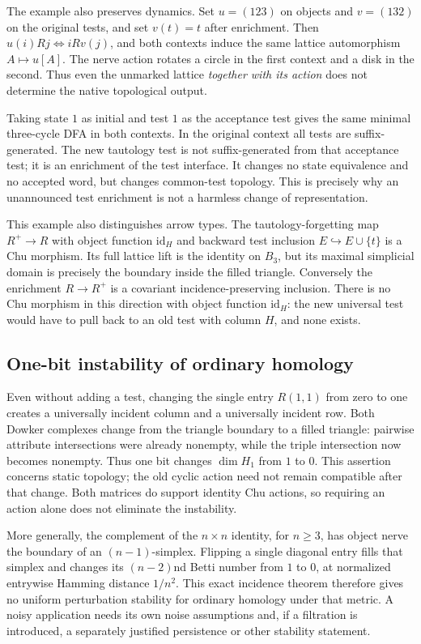 \documentclass[11pt]{article}
\theoremstyle{remark}
\begin{document}
The example also preserves dynamics. Set $u=(123)$ on objects and
$v=(132)$ on the original tests, and set $v(t)=t$ after enrichment.
Then $u(i)Rj\Longleftrightarrow iRv(j)$, and both contexts induce the
same lattice automorphism $A\mapsto u[A]$. The nerve action rotates a
circle in the first context and a disk in the second. Thus even the
unmarked lattice \emph{together with its action} does not determine the
native topological output.

Taking state $1$ as initial and test $1$ as the acceptance test gives
the same minimal three-cycle DFA in both contexts. In the original
context all tests are suffix-generated. The new tautology test is not
suffix-generated from that acceptance test; it is an enrichment of the
test interface. It changes no state equivalence and no accepted word,
but changes common-test topology. This is precisely why an unannounced
test enrichment is not a harmless change of representation.


This example also distinguishes arrow types. The tautology-forgetting
map $R^+\to R$ with object function $\mathrm{id}_H$ and backward test
inclusion $E\hookrightarrow E\cup\{t\}$ is a Chu morphism. Its full
lattice lift is the identity on $B_3$, but its maximal simplicial domain
is precisely the boundary inside the filled triangle. Conversely the
enrichment $R\to R^+$ is a covariant incidence-preserving inclusion.
There is no Chu morphism in this direction with object function
$\mathrm{id}_H$: the new universal test would have to pull back to an
old test with column $H$, and none exists.

\subsection{One-bit instability of ordinary homology}
Even without adding a test, changing the single entry $R(1,1)$ from zero
to one creates a universally incident column and a universally incident
row. Both Dowker complexes change from the triangle boundary to a filled
triangle: pairwise attribute intersections were already nonempty, while
the triple intersection now becomes nonempty. Thus one bit changes
$\dim H_1$ from $1$ to $0$. This assertion concerns static topology; the
old cyclic action need not remain compatible after that change.
Both matrices do support identity Chu actions, so requiring an action
alone does not eliminate the instability.

More generally, the complement of the $n\times n$ identity, for $n\geq3$,
has object nerve the boundary of an $(n-1)$-simplex. Flipping a single
diagonal entry fills that simplex and changes its $(n-2)$nd Betti number
from $1$ to $0$, at normalized entrywise Hamming distance $1/n^2$.
This exact incidence theorem therefore gives no uniform perturbation
stability for ordinary homology under that metric. A noisy application
needs its own noise assumptions and, if a filtration is introduced, a
separately justified persistence or other stability statement.
\end{document}
